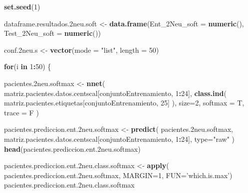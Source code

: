 \documentclass[]{article}
\newenvironment{Shaded}{\begin{snugshade}}{\end{snugshade}}
\newcommand{\ControlFlowTok}[1]{\textcolor[rgb]{0.13,0.29,0.53}{\textbf{#1}}}
\newcommand{\DataTypeTok}[1]{\textcolor[rgb]{0.13,0.29,0.53}{#1}}
\newcommand{\DecValTok}[1]{\textcolor[rgb]{0.00,0.00,0.81}{#1}}
\newcommand{\FloatTok}[1]{\textcolor[rgb]{0.00,0.00,0.81}{#1}}
\newcommand{\KeywordTok}[1]{\textcolor[rgb]{0.13,0.29,0.53}{\textbf{#1}}}
\newcommand{\NormalTok}[1]{#1}
\newcommand{\OperatorTok}[1]{\textcolor[rgb]{0.81,0.36,0.00}{\textbf{#1}}}
\newcommand{\StringTok}[1]{\textcolor[rgb]{0.31,0.60,0.02}{#1}}
\begin{document}
\begin{Shaded}
\begin{Highlighting}[]
\KeywordTok{set.seed}\NormalTok{(}\DecValTok{1}\NormalTok{)}

\NormalTok{dataframe.resultados}\FloatTok{.2}\NormalTok{neu.soft <-}\StringTok{ }\KeywordTok{data.frame}\NormalTok{(}\DataTypeTok{Ent_2Neu_soft =} \KeywordTok{numeric}\NormalTok{(),}
                                             \DataTypeTok{Test_2Neu_soft =} \KeywordTok{numeric}\NormalTok{())}

\NormalTok{conf}\FloatTok{.2}\NormalTok{neu.s <-}\StringTok{ }\KeywordTok{vector}\NormalTok{(}\DataTypeTok{mode =} \StringTok{"list"}\NormalTok{, }\DataTypeTok{length =} \DecValTok{50}\NormalTok{)}

\ControlFlowTok{for}\NormalTok{(i }\ControlFlowTok{in} \DecValTok{1}\OperatorTok{:}\DecValTok{50}\NormalTok{)}
\NormalTok{\{}

\NormalTok{  pacientes}\FloatTok{.2}\NormalTok{neu.softmax <-}\StringTok{ }\KeywordTok{nnet}\NormalTok{( matriz.pacientes.datos.centscal[conjuntoEntrenamiento, }\DecValTok{1}\OperatorTok{:}\DecValTok{24}\NormalTok{],}
                                  \KeywordTok{class.ind}\NormalTok{( matriz.pacientes.etiquetas[conjuntoEntrenamiento, }\DecValTok{25}\NormalTok{] ),}
                                  \DataTypeTok{size=}\DecValTok{2}\NormalTok{,}
                                  \DataTypeTok{softmax =}\NormalTok{ T,}
                                  \DataTypeTok{trace =}\NormalTok{ F )}
  
\NormalTok{  pacientes.prediccion.ent}\FloatTok{.2}\NormalTok{neu.softmax <-}\StringTok{ }\KeywordTok{predict}\NormalTok{( pacientes}\FloatTok{.2}\NormalTok{neu.softmax, }
\NormalTok{                                                    matriz.pacientes.datos.centscal[conjuntoEntrenamiento, }\DecValTok{1}\OperatorTok{:}\DecValTok{24}\NormalTok{], }
                                                    \DataTypeTok{type=}\StringTok{"raw"}\NormalTok{ )}
  \KeywordTok{head}\NormalTok{(pacientes.prediccion.ent}\FloatTok{.2}\NormalTok{neu.softmax)}
  
\NormalTok{  pacientes.prediccion.ent}\FloatTok{.2}\NormalTok{neu.class.softmax <-}\StringTok{ }\KeywordTok{apply}\NormalTok{( pacientes.prediccion.ent}\FloatTok{.2}\NormalTok{neu.softmax, }\DataTypeTok{MARGIN=}\DecValTok{1}\NormalTok{, }\DataTypeTok{FUN=}\StringTok{'which.is.max'}\NormalTok{)}
\NormalTok{  pacientes.prediccion.ent}\FloatTok{.2}\NormalTok{neu.class.softmax}
  

\end{Highlighting}
\end{Shaded}
\end{document}
